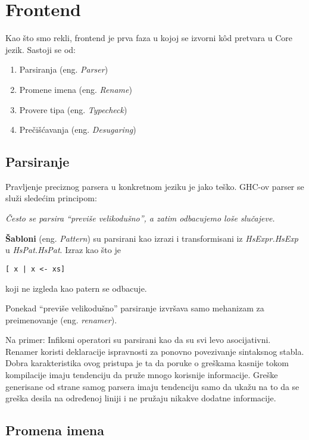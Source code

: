 \section{Frontend}
\label{sec:frontend}

Kao što smo rekli, frontend je prva faza u kojoj se izvorni k\^{o}d pretvara u Core jezik. Sastoji se od:
\begin{enumerate}
	\item Parsiranja (eng. \emph{Parser})
	\item Promene imena (eng. \emph{Rename}) 
	\item Provere tipa (eng. \emph{Typecheck})
	\item Prečišćavanja (eng. \emph{Desugaring})
\end{enumerate} 


\subsection{Parsiranje}
\label{subsec:podnaslovParse}

Pravljenje preciznog parsera u konkretnom jeziku je jako teško. GHC-ov parser se služi sledećim principom: 

\textit{Često se parsira “previše velikodušno”, a zatim odbacujemo loše slučajeve.}

\textbf{Šabloni} (eng. \emph{Pattern}) su parsirani kao izrazi i transformisani iz \textit{HsExpr.HsExp} u \textit{HsPat.HsPat}. Izraz kao što je
\begin{verbatim}
[ x | x <- xs]
\end{verbatim}  
koji ne izgleda kao patern se odbacuje.

Ponekad “previše velikodušno” parsiranje izvršava samo mehanizam za preimenovanje (eng. \emph{renamer}).

Na primer:
Infiksni operatori  su parsirani kao da su svi levo asocijativni. Renamer koristi deklaracije ispravnosti za ponovno povezivanje sintaksnog stabla. Dobra karakteristika ovog pristupa je ta da poruke o greškama kasnije tokom kompilacije imaju tendenciju da pruže mnogo korisnije informacije. Greške generisane od strane samog parsera imaju tendenciju samo da ukažu na to da se greška desila na određenoj liniji i ne pružaju nikakve dodatne informacije.

\subsection{Promena imena}
\label{subsec:podnaslovRename}

